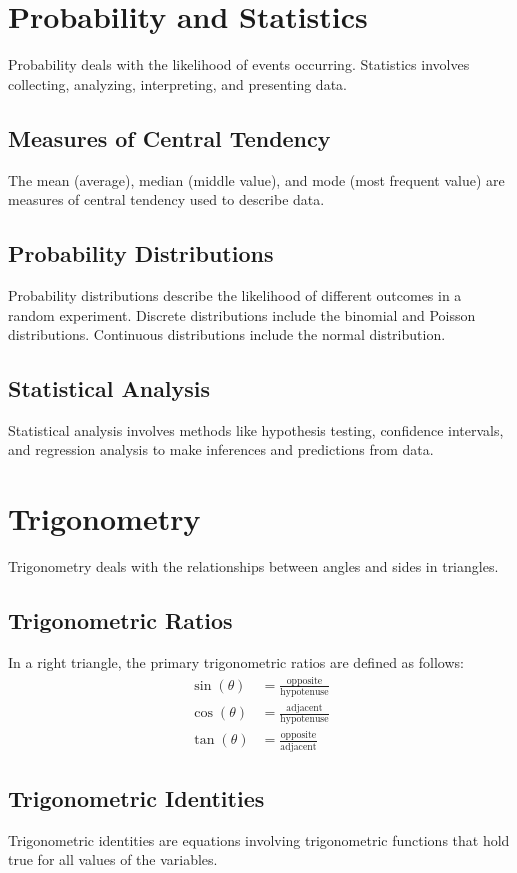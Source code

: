 \documentclass{article}
\begin{document}
\section{Probability and Statistics}
Probability deals with the likelihood of events occurring. Statistics involves collecting, analyzing, interpreting, and presenting data.

\subsection{Measures of Central Tendency}
The mean (average), median (middle value), and mode (most frequent value) are measures of central tendency used to describe data.

\subsection{Probability Distributions}
Probability distributions describe the likelihood of different outcomes in a random experiment. Discrete distributions include the binomial and Poisson distributions. Continuous distributions include the normal distribution.

\subsection{Statistical Analysis}
Statistical analysis involves methods like hypothesis testing, confidence intervals, and regression analysis to make inferences and predictions from data.

\section{Trigonometry}
Trigonometry deals with the relationships between angles and sides in triangles.

\subsection{Trigonometric Ratios}
In a right triangle, the primary trigonometric ratios are defined as follows:
\begin{align*}
    \sin(\theta) &= \frac{\text{opposite}}{\text{hypotenuse}} \\
    \cos(\theta) &= \frac{\text{adjacent}}{\text{hypotenuse}} \\
    \tan(\theta) &= \frac{\text{opposite}}{\text{adjacent}}
\end{align*}

\subsection{Trigonometric Identities}
Trigonometric identities are equations involving trigonometric functions that hold true for all values of the variables.
\end{document}
